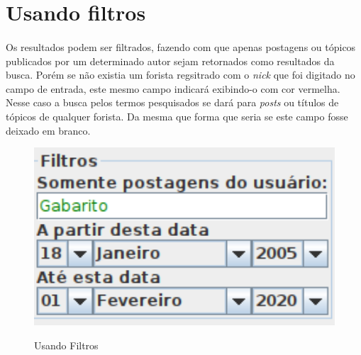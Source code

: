 \documentclass[a4paper,12pt,openany]{book}
\begin{document}
\newpage


\section*{Usando filtros}

\paragraph{}
Os resultados podem ser filtrados, fazendo com que apenas postagens ou tópicos publicados por um determinado autor sejam retornados como resultados da busca. Porém se não existia um forista regsitrado com o \textit{nick} que foi digitado no campo de entrada, este mesmo campo indicará exibindo-o com cor vermelha. Nesse caso a busca pelos termos pesquisados se dará para \textit{posts} ou títulos de tópicos de qualquer forista. Da mesma que forma que seria se este campo fosse deixado em branco.

\begin{figure}[h]
	\caption{Usando Filtros}
	
	\centering %
	\includegraphics[width=12cm]{Figuras/usando-filtros.png} %
	\label{figura:qualquernome}
\end{figure}
\end{document}
